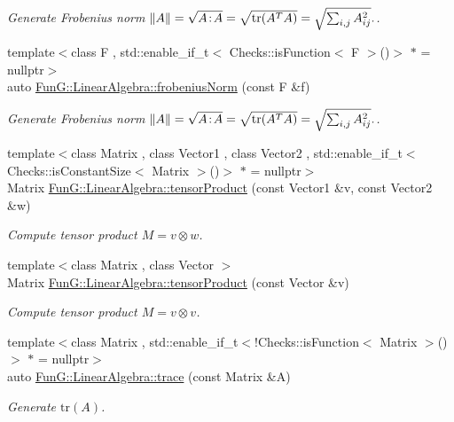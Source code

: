 \begin{DoxyCompactItemize}
\begin{DoxyCompactList}\small\item\em Generate Frobenius norm $ \|A\| = \sqrt{A\negthinspace : \negthinspace A }= \sqrt{\mathrm{tr}(A^TA)} = \sqrt{\sum_{i,j} A_{ij}^2}. $. \end{DoxyCompactList}\item 
{\footnotesize template$<$class F , std\+::enable\+\_\+if\+\_\+t$<$ Checks\+::is\+Function$<$ F $>$()$>$ $\ast$  = nullptr$>$ }\\auto \hyperlink{group__LinearAlgebraGroup_gafa2f358f9310cecb787620ad8ec460a6}{Fun\+G\+::\+Linear\+Algebra\+::frobenius\+Norm} (const F \&f)
\begin{DoxyCompactList}\small\item\em Generate Frobenius norm $ \|A\| = \sqrt{A\negthinspace : \negthinspace A }= \sqrt{\mathrm{tr}(A^TA)} = \sqrt{\sum_{i,j} A_{ij}^2}. $. \end{DoxyCompactList}\item 
{\footnotesize template$<$class Matrix , class Vector1 , class Vector2 , std\+::enable\+\_\+if\+\_\+t$<$ Checks\+::is\+Constant\+Size$<$ Matrix $>$()$>$ $\ast$  = nullptr$>$ }\\Matrix \hyperlink{group__LinearAlgebraGroup_ga5d0e066e6184fb3324d96d20087b5578}{Fun\+G\+::\+Linear\+Algebra\+::tensor\+Product} (const Vector1 \&v, const Vector2 \&w)
\begin{DoxyCompactList}\small\item\em Compute tensor product $ M = v \otimes w $. \end{DoxyCompactList}\item 
{\footnotesize template$<$class Matrix , class Vector $>$ }\\Matrix \hyperlink{group__LinearAlgebraGroup_gae5e82b9e66319511dae5ff0d9304a6b7}{Fun\+G\+::\+Linear\+Algebra\+::tensor\+Product} (const Vector \&v)
\begin{DoxyCompactList}\small\item\em Compute tensor product $ M = v \otimes v $. \end{DoxyCompactList}\item 
{\footnotesize template$<$class Matrix , std\+::enable\+\_\+if\+\_\+t$<$!\+Checks\+::is\+Function$<$ Matrix $>$()$>$ $\ast$  = nullptr$>$ }\\auto \hyperlink{group__LinearAlgebraGroup_ga4d73eb4d46dd9196a31e2d6d557d509e}{Fun\+G\+::\+Linear\+Algebra\+::trace} (const Matrix \&A)
\begin{DoxyCompactList}\small\item\em Generate $\mathrm{tr}(A)$. \end{DoxyCompactList}\item 

\end{DoxyCompactItemize}

